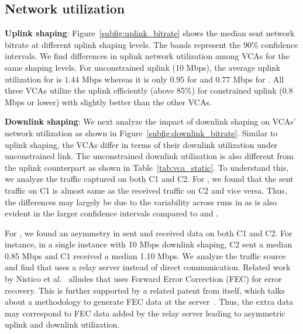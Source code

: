 


\subsection{Network utilization}
\textbf{Uplink shaping}: Figure~\ref{subfig:uplink_bitrate} shows the median sent network bitrate at different uplink shaping levels. The bands represent the 90\% confidence intervals. We find differences in uplink network utilization among VCAs for the same shaping levels. For unconstrained uplink (10 Mbps), the average uplink utilization for \teamsnative is $1.44$ Mbps whereas it is only $0.95$ for \meet and $0.77$ Mbps for \zoom. All three VCAs utilize the uplink efficiently (above 85\%) for constrained uplink (0.8 Mbps or lower) with \meet slightly better than the other VCAs.  


\textbf{Downlink shaping}: We next analyze the impact of downlink shaping on VCAs' network utilization as shown in Figure~\ref{subfig:downlink_bitrate}. Similar to uplink shaping, the VCAs differ in terms of their downlink utilization under unconstrained link. The unconstrained downlink utilization is also different from the uplink counterpart as shown in Table~\ref{tab:vca_static}. To understand this, we analyze the traffic captured on both C1 and C2. For \teams, we found that the sent traffic on C1 is almost same as the received traffic on C2 and vice versa. Thus, the differences may largely be due to the variability across runs in \teams as is also evident in the larger confidence intervals compared to \zoom and \meet. 

For \zoom, we found an asymmetry in sent and received data on both C1 and C2. For instance, in a single instance with 10 Mbps downlink shaping, C2 sent a median 0.85 Mbps and C1 received a median 1.10 Mbps. We analyze the traffic source and find that \zoom uses a relay server instead of direct communication. Related work by Nistico et al.~\cite{nistico2020comparative} alludes that \zoom uses Forward Error Correction (FEC) for error recovery. This is further supported by a related patent from \zoom itself, which talks about a methodology to generate FEC data at the server~\cite{liu2019error}. Thus, the extra data may correspond to FEC data added by the relay server leading to asymmetric uplink and downlink utilization.  

